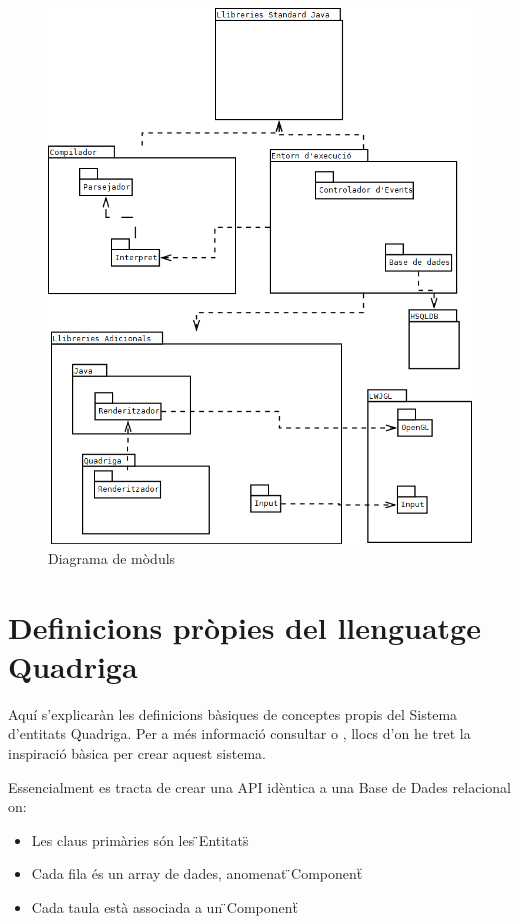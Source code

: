   \begin{figure}
    \includegraphics[width=1\linewidth]{./img/Moduls.png}
    \caption{Diagrama de mòduls \label{fig:DiagramaDeModuls}}
  \end{figure}
  
\section{Definicions pròpies del llenguatge Quadriga}

  Aquí s'explicaràn les definicions bàsiques de conceptes propis del Sistema d'entitats Quadriga. Per a més informació consultar \cite{EntityWikiB} o \cite{Martin07}, llocs d'on he tret la inspiració bàsica per crear aquest sistema.

  Essencialment es tracta de crear una API idèntica a una Base de Dades relacional on:

  \begin{itemize}
    \item Les claus primàries són les \"{}Entitats\"{}
    \item Cada fila és un array de dades, anomenat \"{}Component\"{}
    \item Cada taula està associada a un \"{}Component\"{}
  \end{itemize}

